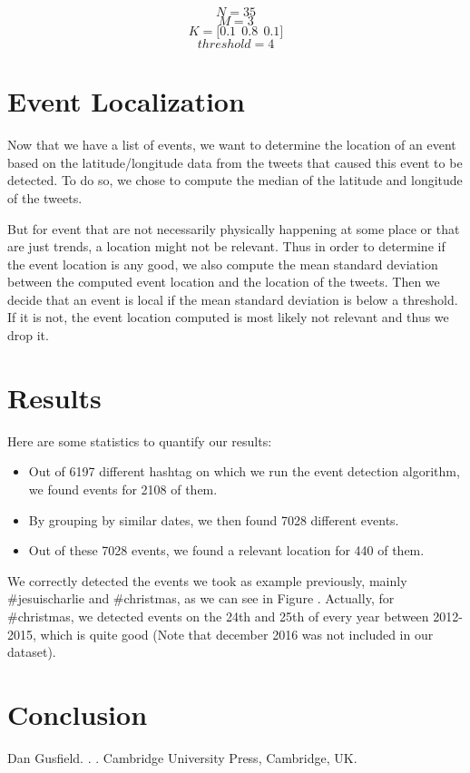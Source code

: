 \documentclass[11pt]{article}
\begin{document}
$$N = 35 $$
$$M = 3$$
$$K = \big[ 0.1\ \ 0.8\ \ 0.1 \big]$$
$$threshold = 4$$

\section{Event Localization}
Now that we have a list of events, we want to determine the location of an event based on the latitude/longitude data from the tweets that caused this event to be detected. To do so, we chose to compute the median of the latitude and longitude of the tweets. 

But for event that are not necessarily physically happening at some place or that are just trends, a location might not be relevant. Thus in order to determine if the event location is any good, we also compute the mean standard deviation between the computed event location and the location of the tweets. Then we decide that an event is local if the mean standard deviation is below a threshold. If it is not, the event location computed is most likely not relevant and thus we drop it.

\section{Results}
Here are some statistics to quantify our results:

\begin{itemize}
  \item Out of 6197 different hashtag on which we run the event detection algorithm, we found events for 2108 of them.
  \item By grouping by similar dates, we then found 7028 different events.
  \item Out of these 7028 events, we found a relevant location for 440 of them.
\end{itemize}

We correctly detected the events we took as example previously, mainly \#jesuischarlie and \#christmas, as we can see in Figure . Actually, for \#christmas, we detected events on the 24th and 25th of every year between 2012-2015, which is quite good (Note that december 2016 was not included in our dataset).





\section{Conclusion}

\begin{thebibliography}{}

Dan Gusfield.
.
.
\newblock Cambridge University Press, Cambridge, UK.

\end{thebibliography}
\end{document}
